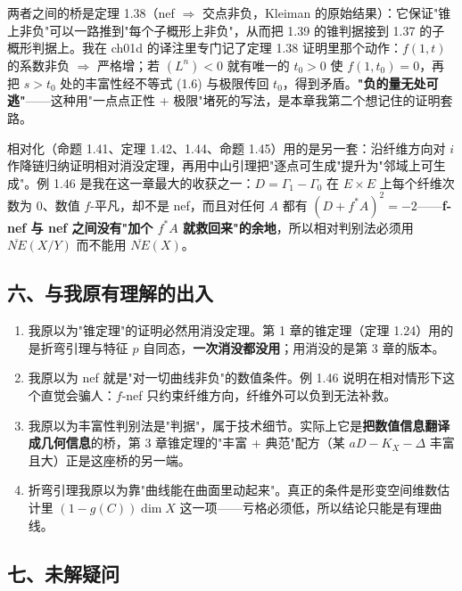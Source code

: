 两者之间的桥是定理 1.38（nef $\Rightarrow$ 交点非负，Kleiman 的原始结果）：它保证"锥上非负"可以一路推到"每个子概形上非负"，从而把 1.39 的锥判据接到 1.37 的子概形判据上。我在 ch01d 的译注里专门记了定理 1.38 证明里那个动作：$f(1,t)$ 的系数非负 $\Rightarrow$ 严格增；若 $(L^n)<0$ 就有唯一的 $t_0>0$ 使 $f(1,t_0)=0$，再把 $s>t_0$ 处的丰富性经不等式 (1.6) 与极限传回 $t_0$，得到矛盾。\textbf{"负的量无处可逃"}——这种用"一点点正性 + 极限"堵死的写法，是本章我第二个想记住的证明套路。

相对化（命题 1.41、定理 1.42、1.44、命题 1.45）用的是另一套：沿纤维方向对 $i$ 作降链归纳证明相对消没定理，再用中山引理把"逐点可生成"提升为"邻域上可生成"。例 1.46 是我在这一章最大的收获之一：$D=\Gamma_1-\Gamma_0$ 在 $E\times E$ 上每个纤维次数为 $0$、数值 $f$-平凡，却不是 nef，而且对任何 $A$ 都有 $(D+f^*A)^2=-2$——\textbf{f-nef 与 nef 之间没有"加个 $f^*A$ 就救回来"的余地}，所以相对判别法必须用 $\overline{NE}(X/Y)$ 而不能用 $\overline{NE}(X)$。

\subsection*{六、与我原有理解的出入}

\begin{enumerate}
\item 我原以为"锥定理"的证明必然用消没定理。第 1 章的锥定理（定理 1.24）用的是折弯引理与特征 $p$ 自同态，\textbf{一次消没都没用}；用消没的是第 3 章的版本。
\item 我原以为 nef 就是"对一切曲线非负"的数值条件。例 1.46 说明在相对情形下这个直觉会骗人：$f$-nef 只约束纤维方向，纤维外可以负到无法补救。
\item 我原以为丰富性判别法是"判据"，属于技术细节。实际上它是\textbf{把数值信息翻译成几何信息}的桥，第 3 章锥定理的"丰富 + 典范"配方（某 $aD-K_X-\Delta$ 丰富且大）正是这座桥的另一端。
\item 折弯引理我原以为靠"曲线能在曲面里动起来"。真正的条件是形变空间维数估计里 $(1-g(C))\dim X$ 这一项——亏格必须低，所以结论只能是有理曲线。
\end{enumerate}

\subsection*{七、未解疑问}

